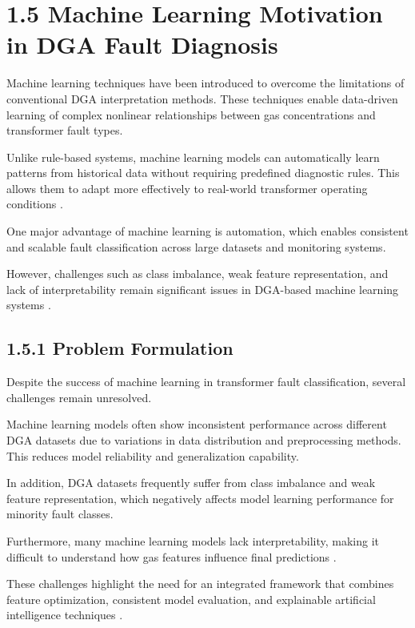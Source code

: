 \section{1.5 Machine Learning Motivation in DGA Fault Diagnosis}

Machine learning techniques have been introduced to overcome the limitations of conventional DGA interpretation methods. These techniques enable data-driven learning of complex nonlinear relationships between gas concentrations and transformer fault types.

Unlike rule-based systems, machine learning models can automatically learn patterns from historical data without requiring predefined diagnostic rules. This allows them to adapt more effectively to real-world transformer operating conditions \parencite{Wang2021GPMC}.

One major advantage of machine learning is automation, which enables consistent and scalable fault classification across large datasets and monitoring systems.

However, challenges such as class imbalance, weak feature representation, and lack of interpretability remain significant issues in DGA-based machine learning systems \parencite{Azmi2025Imbalance}.

\subsection{1.5.1 Problem Formulation}

Despite the success of machine learning in transformer fault classification, several challenges remain unresolved.

Machine learning models often show inconsistent performance across different DGA datasets due to variations in data distribution and preprocessing methods. This reduces model reliability and generalization capability.

In addition, DGA datasets frequently suffer from class imbalance and weak feature representation, which negatively affects model learning performance for minority fault classes.

Furthermore, many machine learning models lack interpretability, making it difficult to understand how gas features influence final predictions \parencite{Laburu2024Insights}.

These challenges highlight the need for an integrated framework that combines feature optimization, consistent model evaluation, and explainable artificial intelligence techniques \parencite{Hu2025InterpretableEdge}.

